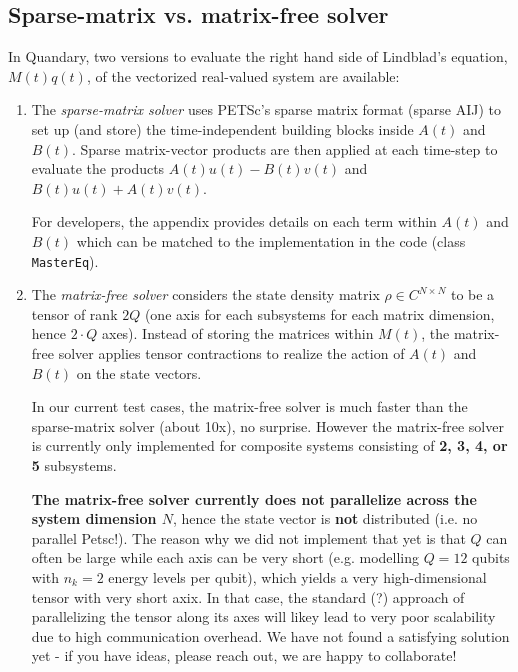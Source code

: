 \documentclass[11pt]{article}
\begin{document}
 \subsection{Sparse-matrix vs. matrix-free solver}

   In Quandary, two versions to evaluate the right hand side of Lindblad's
   equation, $M(t)q(t)$, of the vectorized real-valued system are available: 
   \begin{enumerate}
     \item The \textit{sparse-matrix solver} uses PETSc's sparse matrix format (sparse AIJ) to set up (and store) the time-independent building blocks inside $A(t)$ and $B(t)$. Sparse matrix-vector products are then applied at each time-step to evaluate the products $A(t)u(t) - B(t) v(t)$ and $B(t)u(t) + A(t)v(t)$.  
     
     For developers, the appendix provides details on each term within $A(t)$ and $B(t)$ which can be matched to the implementation in the code (class \texttt{MasterEq}). 

     \item The \textit{matrix-free solver} considers the state density matrix $\rho\in C^{N\times N}$ to be a tensor of rank $2Q$ (one axis for each subsystems for each matrix dimension, hence $2\cdot Q$ axes). Instead of storing the matrices within $M(t)$, the matrix-free solver applies tensor contractions to realize the action of $A(t)$ and $B(t)$ on the state vectors. 

    In our current test cases, the matrix-free solver is much faster than the sparse-matrix solver (about 10x), no surprise. However the matrix-free solver is currently only implemented for composite systems consisting of \textbf{2, 3, 4, or 5} subsystems. 

    \textbf{The matrix-free solver currently does not parallelize across the system dimension $N$}, hence the state vector is \textbf{not} distributed (i.e. no parallel Petsc!). The reason why we did not implement that yet is that $Q$ can often be large while each axis can be very short (e.g. modelling $Q=12$ qubits with $n_k=2$ energy levels per qubit), which yields a very high-dimensional tensor with very short axix. In that case, the standard (?) approach of parallelizing the tensor along its axes will likey lead to very poor scalability due to high communication overhead. We have not found a satisfying solution yet - if you have ideas, please reach out, we are happy to collaborate! 
   \end{enumerate} 
\end{document}
